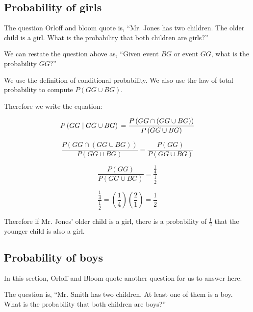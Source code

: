 \documentclass[a4paper,11pt]{article}
\begin{document}
\subsection{Probability of girls}
The question Orloff and bloom quote is, ``Mr. Jones has two children. The
older child is a girl. What is the probability that both children are
girls?''

We can restate the question above as,  ``Given event $BG$
or event $GG$, what is the probability $GG$?'' 

We use the definition of conditional probability. We also use the law of
total probability to compute $P \left( GG \cup BG \right)$.

Therefore we write the equation:

\begin{equation}
P \left( GG \mid GG \cup BG \right) \\
 = \frac{ P \left( GG \cap \left( GG \cup BG \right) \right)}
  {P \left( GG \cup BG \right)}
\end{equation}

\begin{equation}
\frac{ P \left( GG \cap \left( GG \cup BG \right) \right)}
  {P \left( GG \cup BG \right)}
 = \frac{ P \left( GG \right) }
  {P \left( GG \cup BG \right)}
\end{equation}

\begin{equation}
 \frac{ P \left( GG \right) }
  {P \left( GG \cup BG \right)}
= \frac { \frac{1}{4} }
{ \frac{1}{2} }
\end{equation}

\begin{equation}
\frac { \frac{1}{4} }
{ \frac{1}{2} }
= \left( \frac{1}{4} \right) \left( \frac{2}{1} \right)
=\frac{1}{2}
\end{equation}

Therefore if Mr. Jones' older child is a girl, there is a 
probability of $\frac{1}{2}$ that the younger child is also a girl.


\subsection{Probability of boys}

In this section, Orloff and Bloom quote another question for us to 
answer here.

The question is, ``Mr. Smith has two children. At least one of them is a
boy. What is the probability that both children are boys?''
\end{document}
